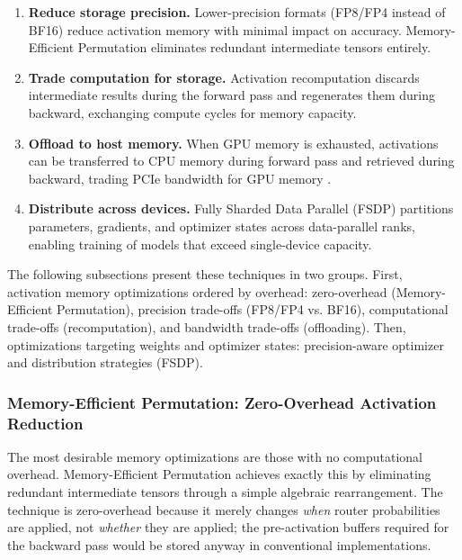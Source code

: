 \begin{enumerate}
    \item \textbf{Reduce storage precision.} Lower-precision formats (FP8/FP4 instead of BF16) reduce activation memory with minimal impact on accuracy. Memory-Efficient Permutation eliminates redundant intermediate tensors entirely.
    \item \textbf{Trade computation for storage.} Activation recomputation \cite{chen2016training,korthikanti2022reducingactivationrecomputationlarge,beaumont2021optimal} discards intermediate results during the forward pass and regenerates them during backward, exchanging compute cycles for memory capacity.
    \item \textbf{Offload to host memory.} When GPU memory is exhausted, activations can be transferred to CPU memory during forward pass and retrieved during backward, trading PCIe bandwidth for GPU memory \cite{ren2021zerooffload}.
    \item \textbf{Distribute across devices.} Fully Sharded Data Parallel (FSDP) \cite{zhao2023pytorchfsdp,rajbhandari2020zero,rajbhandari2021zeroinf,rajbhandari2023zeropp} partitions parameters, gradients, and optimizer states across data-parallel ranks, enabling training of models that exceed single-device capacity. 
\end{enumerate}

The following subsections present these techniques in two groups. First, activation memory optimizations ordered by overhead: zero-overhead (Memory-Efficient Permutation), precision trade-offs (FP8/FP4 vs. BF16), computational trade-offs (recomputation), and bandwidth trade-offs (offloading). Then, optimizations targeting weights and optimizer states: precision-aware optimizer and distribution strategies (FSDP).

\subsubsection{Memory-Efficient Permutation: Zero-Overhead Activation Reduction}\label{sec:mem-eff-permute}

The most desirable memory optimizations are those with no computational overhead. Memory-Efficient Permutation achieves exactly this by eliminating redundant intermediate tensors through a simple algebraic rearrangement. The technique is zero-overhead because it merely changes \emph{when} router probabilities are applied, not \emph{whether} they are applied; the pre-activation buffers required for the backward pass would be stored anyway in conventional implementations.

